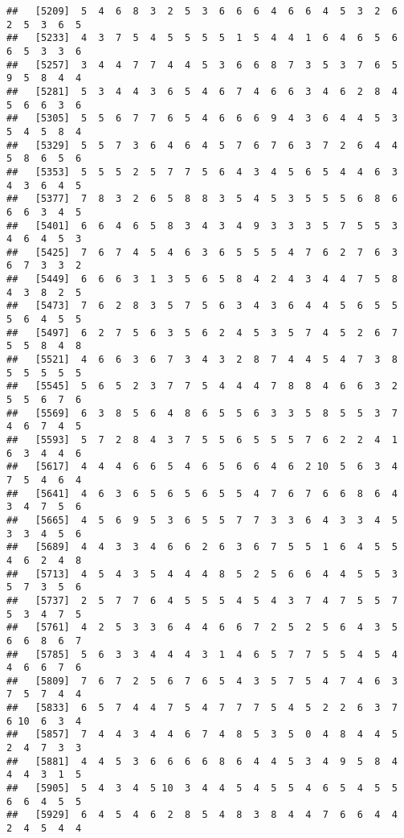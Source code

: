 \documentclass[
]{book}
\begin{document}
\begin{verbatim}
##   [5209]  5  4  6  8  3  2  5  3  6  6  6  4  6  6  4  5  3  2  6  2  5  3  6  5
##   [5233]  4  3  7  5  4  5  5  5  5  1  5  4  4  1  6  4  6  5  6  6  5  3  3  6
##   [5257]  3  4  4  7  7  4  4  5  3  6  6  8  7  3  5  3  7  6  5  9  5  8  4  4
##   [5281]  5  3  4  4  3  6  5  4  6  7  4  6  6  3  4  6  2  8  4  5  6  6  3  6
##   [5305]  5  5  6  7  7  6  5  4  6  6  6  9  4  3  6  4  4  5  3  5  4  5  8  4
##   [5329]  5  5  7  3  6  4  6  4  5  7  6  7  6  3  7  2  6  4  4  5  8  6  5  6
##   [5353]  5  5  5  2  5  7  7  5  6  4  3  4  5  6  5  4  4  6  3  4  3  6  4  5
##   [5377]  7  8  3  2  6  5  8  8  3  5  4  5  3  5  5  5  6  8  6  6  6  3  4  5
##   [5401]  6  6  4  6  5  8  3  4  3  4  9  3  3  3  5  7  5  5  3  4  6  4  5  3
##   [5425]  7  6  7  4  5  4  6  3  6  5  5  5  4  7  6  2  7  6  3  6  7  3  3  2
##   [5449]  6  6  6  3  1  3  5  6  5  8  4  2  4  3  4  4  7  5  8  4  3  8  2  5
##   [5473]  7  6  2  8  3  5  7  5  6  3  4  3  6  4  4  5  6  5  5  5  6  4  5  5
##   [5497]  6  2  7  5  6  3  5  6  2  4  5  3  5  7  4  5  2  6  7  5  5  8  4  8
##   [5521]  4  6  6  3  6  7  3  4  3  2  8  7  4  4  5  4  7  3  8  5  5  5  5  5
##   [5545]  5  6  5  2  3  7  7  5  4  4  4  7  8  8  4  6  6  3  2  5  5  6  7  6
##   [5569]  6  3  8  5  6  4  8  6  5  5  6  3  3  5  8  5  5  3  7  4  6  7  4  5
##   [5593]  5  7  2  8  4  3  7  5  5  6  5  5  5  7  6  2  2  4  1  6  3  4  4  6
##   [5617]  4  4  4  6  6  5  4  6  5  6  6  4  6  2 10  5  6  3  4  7  5  4  6  4
##   [5641]  4  6  3  6  5  6  5  6  5  5  4  7  6  7  6  6  8  6  4  3  4  7  5  6
##   [5665]  4  5  6  9  5  3  6  5  5  7  7  3  3  6  4  3  3  4  5  3  3  4  5  6
##   [5689]  4  4  3  3  4  6  6  2  6  3  6  7  5  5  1  6  4  5  5  4  6  2  4  8
##   [5713]  4  5  4  3  5  4  4  4  8  5  2  5  6  6  4  4  5  5  3  5  7  3  5  6
##   [5737]  2  5  7  7  6  4  5  5  5  4  5  4  3  7  4  7  5  5  7  5  3  4  7  5
##   [5761]  4  2  5  3  3  6  4  4  6  6  7  2  5  2  5  6  4  3  5  6  6  8  6  7
##   [5785]  5  6  3  3  4  4  4  3  1  4  6  5  7  7  5  5  4  5  4  4  6  6  7  6
##   [5809]  7  6  7  2  5  6  7  6  5  4  3  5  7  5  4  7  4  6  3  7  5  7  4  4
##   [5833]  6  5  7  4  4  7  5  4  7  7  7  5  4  5  2  2  6  3  7  6 10  6  3  4
##   [5857]  7  4  4  3  4  4  6  7  4  8  5  3  5  0  4  8  4  4  5  2  4  7  3  3
##   [5881]  4  4  5  3  6  6  6  6  8  6  4  4  5  3  4  9  5  8  4  4  4  3  1  5
##   [5905]  5  4  3  4  5 10  3  4  4  5  4  5  5  4  6  5  4  5  5  6  6  4  5  5
##   [5929]  6  4  5  4  6  2  8  5  4  8  3  8  4  4  7  6  6  4  4  2  4  5  4  4

\end{verbatim}
\end{document}
